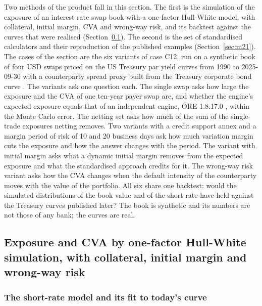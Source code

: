 Two methods of the product fall in this section. The first is the simulation of the exposure of an interest rate swap book with a
one-factor Hull-White model, with collateral, initial margin, CVA and wrong-way risk, and its backtest against the curves that were
realised (Section~\ref{sec:m20}). The second is the set of standardised calculators and their reproduction of the published examples
(Section~\ref{sec:m21}). The cases of the section are the six variants of case C12, run on a synthetic book of four USD swaps
priced on the US Treasury par yield curves from 1990 to 2025-09-30 \citep{ccr:treasurypar} with a counterparty spread proxy built
from the Treasury corporate bond curve \citep{ccr:treasuryhqm}. The variants ask one question each. The single swap asks how large the
exposure and the CVA of one ten-year payer swap are, and whether the engine's expected exposure equals that of an independent engine,
ORE 1.8.17.0 \citep{ccr:ore}, within the Monte Carlo error. The netting set asks how much of the sum of the single-trade exposures
netting removes. Two variants with a credit support annex and a margin period of risk of 10 and 20 business days ask how much
variation margin cuts the exposure and how the answer changes with the period. The variant with initial margin asks what a dynamic
initial margin removes from the expected exposure and what the standardised approach credits for it. The wrong-way risk variant asks
how the CVA changes when the default intensity of the counterparty moves with the value of the portfolio. All six share one backtest:
would the simulated distributions of the book value and of the short rate have held against the Treasury curves published later?
The book is synthetic and its numbers are not those of any bank; the curves are real.

\subsection{Exposure and CVA by one-factor Hull-White simulation, with collateral, initial margin and wrong-way risk}
\label{sec:m20}

\subsubsection{The short-rate model and its fit to today's curve}

